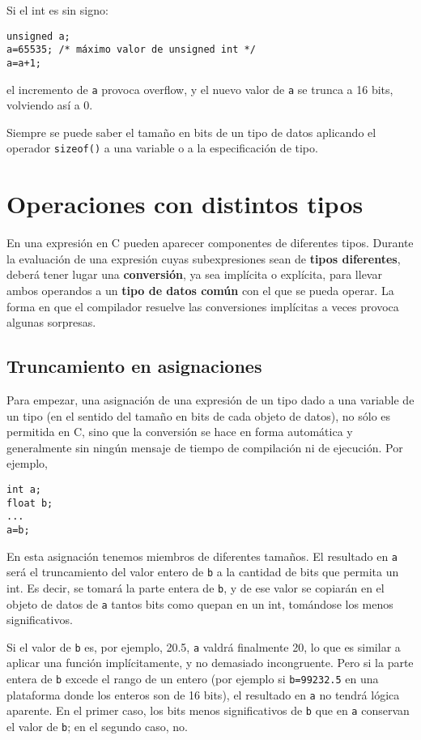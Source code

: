 Si el int es sin signo:

\begin{lstlisting}
unsigned a;
a=65535; /* máximo valor de unsigned int */
a=a+1; 
\end{lstlisting}

el incremento de \lstinline{a} provoca overflow, y el nuevo valor de \lstinline{a} se trunca a 16 bits, volviendo así a 0.

Siempre se puede saber el tamaño en bits de un tipo de datos aplicando el operador \lstinline{sizeof()} a una
variable o a la especificación de tipo.

\section{Operaciones con distintos tipos}

En una expresión en C pueden aparecer componentes de diferentes tipos. Durante la evaluación de una
expresión cuyas subexpresiones sean de \textbf{tipos diferentes}, deberá tener lugar una \textbf{conversión}, ya sea
implícita o explícita, para llevar ambos operandos a un \textbf{tipo de datos común} con el que se pueda
operar. La forma en que el compilador resuelve las conversiones implícitas a veces provoca algunas
sorpresas.

\subsection{Truncamiento en asignaciones}

Para empezar, una asignación de una expresión de un tipo dado a una variable de un tipo  (en el sentido
del tamaño en bits de cada objeto de datos), no
sólo es permitida en C, sino que la conversión se hace en forma automática y generalmente sin ningún
mensaje de tiempo de compilación ni de ejecución. Por ejemplo,
\begin{lstlisting}
int a;
float b;
...
a=b;
\end{lstlisting}

En esta asignación tenemos miembros de diferentes tamaños. El resultado en \lstinline{a} será el truncamiento
del valor entero de \lstinline{b} a la cantidad de bits que permita un int. Es decir, se tomará la parte entera de \lstinline{b}, y
de ese valor se copiarán en el objeto de datos de \lstinline{a} tantos bits como quepan en un int, tomándose
los menos significativos.

Si el valor de \lstinline{b} es, por ejemplo, 20.5, \lstinline{a} valdrá finalmente 20, lo que es similar a aplicar una función
 implícitamente, y no demasiado incongruente. Pero si la parte entera de \lstinline{b} excede el
rango de un entero (por ejemplo si \lstinline{b=99232.5} en una plataforma donde los enteros son de 16 bits), el resultado en \lstinline{a} no tendrá lógica aparente. En el primer caso, los bits menos significativos de \lstinline{b} que  en \lstinline{a} conservan el valor de \lstinline{b}; en el segundo caso, no.

